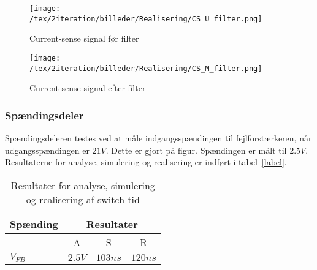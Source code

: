 
\begin{figure}[H]
	\center
	\texttt{[image: /tex/2iteration/billeder/Realisering/CS\_U\_filter.png]}
	\caption{Current-sense signal før filter}
	\label{fig:CS_U_filter}
\end{figure}

\begin{figure}[H]
	\center
	\texttt{[image: /tex/2iteration/billeder/Realisering/CS\_M\_filter.png]}
	\caption{Current-sense signal efter filter}
	\label{fig:CS_M_filter}
\end{figure}


\subsubsection{Spændingsdeler}
Spændingsdeleren testes ved at måle indgangsspændingen til fejlforstærkeren, når udgangsspændingen er $21V$. Dette er gjort på figur. Spændingen er målt til $2.5V$. Resultaterne for analyse, simulering og realisering er indført i tabel~\ref{label}.


\begin{table}[H] 			
	\centering
	\begin{tabularx}{\textwidth}{|X|c|c|c|}
		\hline
		\textbf{Spænding} & \multicolumn{3}{|c|}{\textbf{Resultater}} 		\\ \hline
		& A & S & R 									\\ \hline
		$V_{FB}$ & $2.5V$ & $103ns$ & $120ns$ 									\\ \hline 
		
	\end{tabularx}
	\caption{Resultater for analyse, simulering og realisering af switch-tid}
	\label{tab:resultat_voltage_divider}
\end{table}

